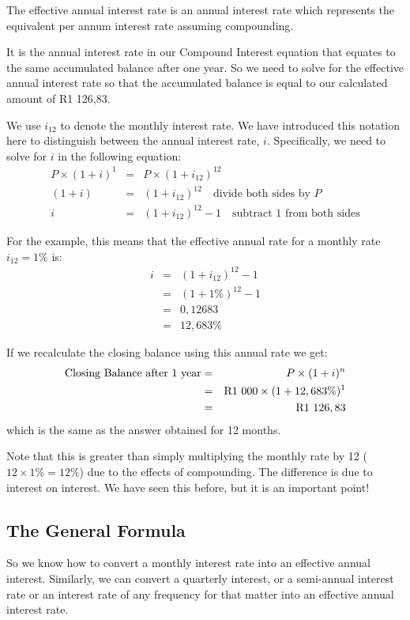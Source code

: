 The effective annual interest rate is an annual interest rate which represents the equivalent per annum interest rate assuming compounding.

It is the annual interest rate in our Compound Interest equation that equates to the same accumulated balance after one year. So we need to solve for the effective annual interest rate so that the accumulated balance is equal to our calculated amount of R1 126,83.

We use $i_{12}$ to denote the monthly interest rate. We have introduced this notation here to distinguish between the annual interest rate, $i$. Specifically, we need to solve for $i$ in the following equation:
\begin{eqnarray*}
P\times (1 + i) ^1 &=& P\times (1 + i_{12})^{12}\\
(1 + i) &=& (1 + i_{12})^{12}\quad\mbox{divide both sides by $P$}\\
i &=& (1 + i_{12})^{12}-1\quad\mbox{subtract 1 from both sides}
\end{eqnarray*}

For the example, this means that the effective annual rate for a monthly rate $i_{12}=1\%$ is:
\begin{eqnarray*}
i &=& (1 + i_{12})^{12}-1\\
&=& (1 + 1\%)^{12}-1\\
&=&0,12683\\
&=&12,683\%
\end{eqnarray*}

If we recalculate the closing balance using this annual rate we get:
\begin{eqnarray*}
\mbox{Closing Balance after 1 year}&=& P \times (1 + i)^n \\
&=& \rm{R}1~000 \times (1 + 12,683\%)^{1} \\
&=& \rm{R}1~126,83
\end{eqnarray*}
which is the same as the answer obtained for 12 months.

Note that this is greater than simply multiplying the monthly rate by 12 ($12 \times 1\% = 12\%$) due to the effects of compounding. The difference is due to interest on interest. We have seen this before, but it is an important point!

\subsection{The General Formula}
So we know how to convert a monthly interest rate into an effective annual interest. Similarly, we can convert a quarterly interest, or a semi-annual interest rate or an interest rate of any frequency for that matter into an effective annual interest rate.

